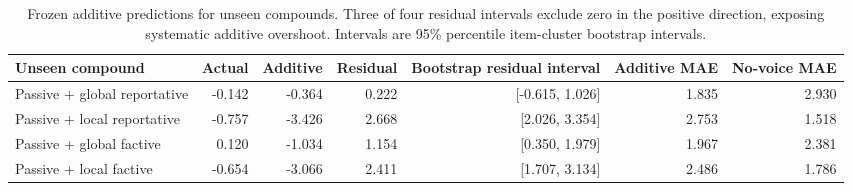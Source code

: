 \begin{table}[H]
\centering
\footnotesize
\setlength{\tabcolsep}{3pt}
\begin{tabularx}{\textwidth}{Xrrrrrr}
\toprule
Unseen compound & Actual & Additive & Residual & Bootstrap residual interval & Additive MAE & No-voice MAE \\
\midrule
Passive + global reportative & -0.142 & -0.364 & 0.222 & [-0.615, 1.026] & 1.835 & 2.930 \\
Passive + local reportative & -0.757 & -3.426 & 2.668 & [2.026, 3.354] & 2.753 & 1.518 \\
Passive + global factive & 0.120 & -1.034 & 1.154 & [0.350, 1.979] & 1.967 & 2.381 \\
Passive + local factive & -0.654 & -3.066 & 2.411 & [1.707, 3.134] & 2.486 & 1.786 \\
\bottomrule
\end{tabularx}
\caption{Frozen additive predictions for unseen compounds. Three of four residual intervals exclude zero in the positive direction, exposing systematic additive overshoot. Intervals are 95\% percentile item-cluster bootstrap intervals.}
\label{tab:holdout}
\end{table}
